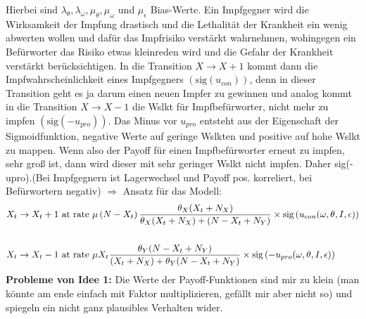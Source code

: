 \documentclass[10pt,a4paper]{article}
\begin{document}
Hierbei sind $\lambda_{\theta}, \lambda_{\omega}, \mu_{\theta}, \mu_{\omega}$ und $\mu_{\epsilon}$ Bias-Werte. Ein Impfgegner wird die Wirksamkeit der Impfung drastisch und die Lethalität der Krankheit ein wenig abwerten wollen und dafür das Impfrisiko verstärkt wahrnehmen, wohingegen ein Befürworter das Risiko etwas kleinreden wird und die Gefahr der Krankheit verstärkt berücksichtigen.\newline
In die Transition $X \rightarrow X + 1$ kommt dann die Impfwahrscheinlichkeit eines Impfgegners $(\mathrm{sig}\left( u_{con}\right))$, denn in dieser Transition geht es ja darum einen neuen Impfer zu gewinnen und analog kommt in die Transition $X \rightarrow X-1$ die Wslkt für Impfbefürworter, nicht mehr zu impfen $(\mathrm{sig}\left( -u_{pro}\right))$.\newline
Das Minus vor $u_{pro}$ entsteht aus der Eigenschaft der Sigmoidfunktion, negative Werte auf geringe Wslkten und positive auf hohe Wslkt zu mappen. Wenn also der Payoff für einen Impfbefürworter erneut zu impfen, sehr groß ist, dann wird dieser mit sehr geringer Wslkt nicht impfen. Daher sig(-upro).(Bei Impfgegnern ist Lagerwechsel und Payoff pos. korreliert, bei Befürwortern negativ)\newline
$\Rightarrow$ Ansatz für das Modell:
\begin{align*}
\begin{split}
X_t \rightarrow X_t + 1 & \textnormal{ at rate } \mu\left(N-X_t\right)\frac{\theta_X (X_t + N_X)}{\theta_X (X_t + N_X) + (N - X_t + N_Y)} \times \mathrm{sig}\left(u_{con}(\omega, \theta, I, \epsilon)\right) \\
&\\
X_t \rightarrow X_t - 1 & \textnormal{ at rate } \mu X_t\frac{\theta_Y(N-X_t+N_Y)}{(X_t + N_X) + \theta_Y(N-X_t+N_Y)} \times \mathrm{sig}\left(- u_{pro}(\omega, \theta, I, \epsilon)\right)
\end{split}
\end{align*}
\textbf{Probleme von Idee 1:}\newline
Die Werte der Payoff-Funktionen sind mir zu klein (man könnte am ende einfach mit Faktor multiplizieren, gefällt mir aber nicht so) und spiegeln ein nicht ganz plausibles Verhalten wider.
\end{document}
